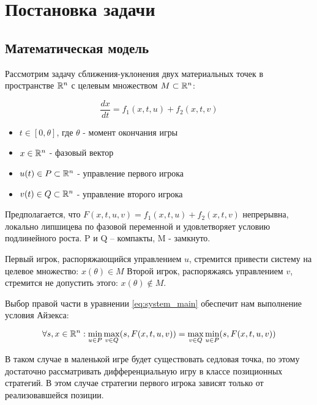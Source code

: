 \chapter{Постановка задачи}

\section{Математическая модель}

Рассмотрим задачу сближения-уклонения двух материальных точек
в пространстве $\mathbb{R}^n$ с целевым множеством $M \subset \mathbb{R}^n$: 

\begin{equation}
    \label{eq:system_main}
    \frac{dx}{dt} = f_1(x,t,u) + f_2(x,t,v)
\end{equation}
 
\begin{itemize}
    \item $t \in [0,\theta]$, где $\theta$ - момент окончания игры
    \item $x \in \mathbb{R}^n$ - фазовый вектор
    \item $u(t) \in P \subset \mathbb{R}^n$ - управление первого игрока
    \item $v(t) \in Q \subset \mathbb{R}^n$ - управление второго игрока
\end{itemize} 

Предполагается, что $F(x,t,u,v) = f_1(x,t,u) + f_2(x,t,v)$ непрерывна, локально липшицева
по фазовой переменной
и удовлетворяет условию подлинейного роста.
P и Q – компакты, M - замкнуто.

Первый игрок, распоряжающийся управлением $u$,
стремится привести систему на целевое множество: $x(\theta) \in M$ 
Второй игрок, распоряжаясь управлением $v$,
стремится не допустить этого: $x(\theta) \notin M$.

Выбор правой части в уравнении \ref{eq:system_main}
обеспечит нам выполнение условия Айзекса:

\begin{equation}
    \label{eq:isaacs}
    \forall s, x \in \mathbb{R}^n :
    \min \limits_{u \in P} \max \limits_{v \in Q}
    (s, F(x,t,u,v)) =
    \max \limits_{v \in Q} \min \limits_{u \in P}
    (s, F(x,t,u,v)) 
\end{equation}
 
В таком случае в маленькой игре будет существовать седловая точка,
по этому достаточно рассматривать дифференциальную игру
в классе позиционных стратегий.
В этом случае стратегии первого игрока зависят
только от реализовавшейся позиции.

